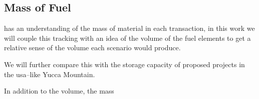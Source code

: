 \subsection{Mass of Fuel}
\label{sec:mass_of_fuel}

\cyclus has an understanding of the mass of material in each
transaction, in this work we will couple this tracking with an idea of
the volume of the fuel elements to get a relative sense of the volume
each scenario would produce.

We will further compare this with the storage capacity of proposed
projects in the \gls{usa}--like Yucca Mountain.

In addition to the volume, the mass %